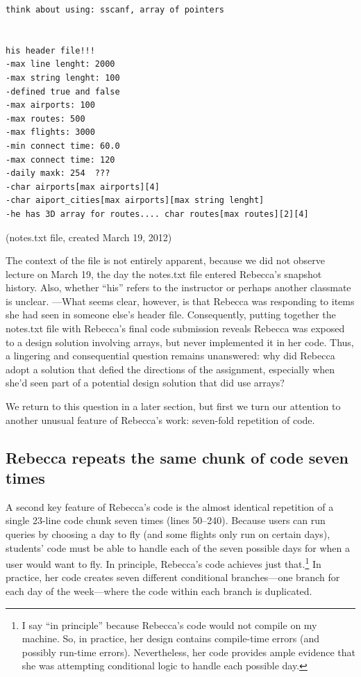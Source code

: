 \begin{verbatim}
think about using: sscanf, array of pointers


his header file!!!
-max line lenght: 2000
-max string lenght: 100
-defined true and false
-max airports: 100
-max routes: 500
-max flights: 3000
-min connect time: 60.0
-max connect time: 120
-daily maxk: 254  ???
-char airports[max airports][4]
-char aiport_cities[max airports][max string lenght]
-he has 3D array for routes.... char routes[max routes][2][4]
\end{verbatim}

(notes.txt file, created March 19, 2012)

The context of the file is not entirely apparent, because we did not observe lecture on March 19, the day the notes.txt file entered Rebecca's snapshot history. Also, whether ``his'' refers to the instructor or perhaps another classmate is unclear. ---What seems clear, however, is that Rebecca was responding to items she had seen in someone else's header file. Consequently, putting together the notes.txt file with Rebecca's final code submission reveals Rebecca was exposed to a design solution involving arrays, but never implemented it in her code. Thus, a lingering and consequential question remains unanswered: why did Rebecca adopt a solution that defied the directions of the assignment, especially when she'd seen part of a potential design solution that did use arrays?

We return to this question in a later section, but first we turn our attention to another unusual feature of Rebecca's work: seven-fold repetition of code.

\subsection{Rebecca repeats the same chunk of code seven times}\label{rebecca-repeats-the-same-chunk-of-code-seven-times}

A second key feature of Rebecca's code is the almost identical repetition of a single 23-line code chunk seven times (lines 50--240). Because users can run queries by choosing a day to fly (and some flights only run on certain days), students' code must be able to handle each of the seven possible days for when a user would want to fly. In principle, Rebecca's code achieves just that.\footnote{I say ``in principle'' because Rebecca's code would not compile on my machine. So, in practice, her design contains compile-time errors (and possibly run-time errors). Nevertheless, her code provides ample evidence that she was attempting conditional logic to handle each possible day.} In practice, her code creates seven different conditional branches---one branch for each day of the week---where the code within each branch is duplicated.

